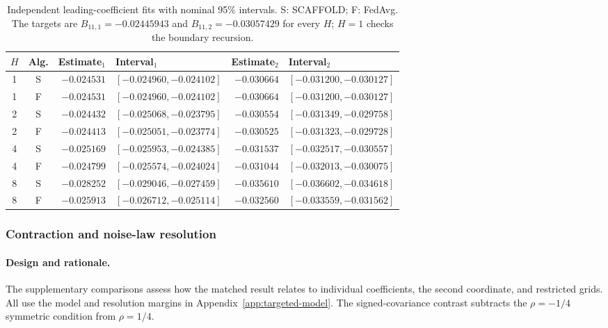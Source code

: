 \begin{table}[tbp]
\centering\small
\caption{Independent leading-coefficient fits with nominal 95\% intervals.
S: SCAFFOLD; F: FedAvg. The targets are
$B_{11,1}=-0.02445943$ and $B_{11,2}=-0.03057429$ for every $H$;
$H=1$ checks the boundary recursion.}
\label{tab:supp-leading}
\begin{tabular}{@{}ccrlrl@{}}\toprule
$H$ & Alg. & Estimate$_1$ & Interval$_1$ & Estimate$_2$ & Interval$_2$ \\ \midrule
1 & S & $-0.024531$ & $[-0.024960,-0.024102]$ & $-0.030664$ & $[-0.031200,-0.030127]$ \\
1 & F & $-0.024531$ & $[-0.024960,-0.024102]$ & $-0.030664$ & $[-0.031200,-0.030127]$ \\
2 & S & $-0.024432$ & $[-0.025068,-0.023795]$ & $-0.030554$ & $[-0.031349,-0.029758]$ \\
2 & F & $-0.024413$ & $[-0.025051,-0.023774]$ & $-0.030525$ & $[-0.031323,-0.029728]$ \\
4 & S & $-0.025169$ & $[-0.025953,-0.024385]$ & $-0.031537$ & $[-0.032517,-0.030557]$ \\
4 & F & $-0.024799$ & $[-0.025574,-0.024024]$ & $-0.031044$ & $[-0.032013,-0.030075]$ \\
8 & S & $-0.028252$ & $[-0.029046,-0.027459]$ & $-0.035610$ & $[-0.036602,-0.034618]$ \\
8 & F & $-0.025913$ & $[-0.026712,-0.025114]$ & $-0.032560$ & $[-0.033559,-0.031562]$ \\
\bottomrule\end{tabular}\end{table}

\subsubsection{Contraction and noise-law resolution}
\label{app:targeted-results}

\paragraph{Design and rationale.}
The supplementary comparisons assess how the matched result relates to
individual coefficients, the second coordinate, and restricted grids.
All use the model and resolution margins in
Appendix~\ref{app:targeted-model}. The signed-covariance contrast
subtracts the $\rho=-1/4$ symmetric condition from $\rho=1/4$.

